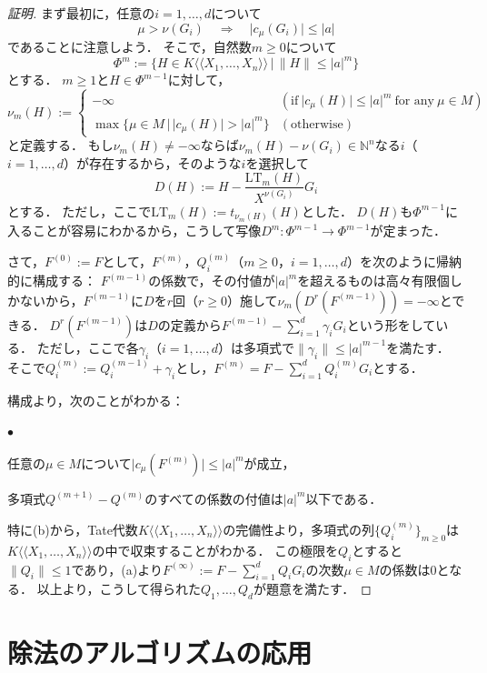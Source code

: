 \documentclass[a4paper,12pt, dvipdfmx]{jsbook}
\def\N{\mathbb{N}}
\def\dl{\langle\!\langle}
\def\dr{\rangle\!\rangle}
\def\LT{\mathrm{LT}}
\newcommand{\abs}[1]{\lvert#1\rvert}
\newcommand{\abss}[1]{\|#1\|}
\renewenvironment{itemize}%
{%
   \begin{list}{\parbox{1zw}{$\bullet$}}%
   {%
      \setlength{\topsep}{.5zh}
      \setlength{\itemindent}{0zw}
      \setlength{\leftmargin}{3zw}%
      \setlength{\rightmargin}{0zw}%
      \setlength{\labelsep}{.5zw}%
      \setlength{\labelwidth}{3zw}%
      \setlength{\itemsep}{0.2em}%
      \setlength{\parsep}{0em}%
      \setlength{\listparindent}{0zw}%
   }
}{%
   \end{list}%
}
\theoremstyle{plain}
\theoremstyle{definition}
\begin{document}
\begin{proof}[証明]
まず最初に，任意の$i=1,\ldots,d$について
$$
\mu>\nu(G_i)\quad\Longrightarrow\quad\abs{c_{\mu}(G_i)}\leq\abs{a}
$$
であることに注意しよう．
そこで，自然数$m\geq 0$について
$$
\Phi^m:=\{H\in K\dl X_1,\ldots,X_n\dr\,|\,\abss{H}\leq\abs{a}^m\}
$$
とする．
$m\geq 1$と$H\in\Phi^{m-1}$に対して，
$$
\nu_m(H):=\begin{cases}-\infty&(\textrm{if}\ \abs{c_{\mu}(H)}\leq\abs{a}^m\ \textrm{for any}\ \mu\in M)\\ \max\{\mu\in M\,|\,\abs{c_{\mu}(H)}>\abs{a}^m\}&(\textrm{otherwise})\end{cases}
$$
と定義する．
もし$\nu_m(H)\neq-\infty$ならば$\nu_m(H)-\nu(G_i)\in\N^n$なる$i$（$i=1,\ldots,d$）が存在するから，そのような$i$を選択して
$$
D(H):=H-\frac{\LT_m(H)}{X^{\nu(G_i)}}G_i
$$
とする．
ただし，ここで$\LT_m(H):=t_{\nu_m(H)}(H)$とした．
$D(H)$も$\Phi^{m-1}$に入ることが容易にわかるから，こうして写像$D^m\colon\Phi^{m-1}\rightarrow\Phi^{m-1}$が定まった．

さて，$F^{(0)}:=F$として，$F^{(m)}$，$Q^{(m)}_i$（$m\geq 0$，$i=1,\ldots,d$）を次のように帰納的に構成する：
$F^{(m-1)}$の係数で，その付値が$\abs{a}^m$を超えるものは高々有限個しかないから，$F^{(m-1)}$に$D$を$r$回（$r\geq 0$）施して$\nu_m(D^r(F^{(m-1)}))=-\infty$とできる．
$D^r(F^{(m-1)})$は$D$の定義から$F^{(m-1)}-\sum^d_{i=1}\gamma_iG_i$という形をしている．
ただし，ここで各$\gamma_i$（$i=1,\ldots,d$）は多項式で$\abss{\gamma_i}\leq\abs{a}^{m-1}$を満たす．
そこで$Q^{(m)}_i:=Q^{(m-1)}_i+\gamma_i$とし，$F^{(m)}=F-\sum^d_{i=1}Q^{(m)}_iG_i$とする．

構成より，次のことがわかる：
\begin{itemize}
\item[{\rm (a)}] 任意の$\mu\in M$について$\abs{c_{\mu}(F^{(m)})}\leq\abs{a}^m$が成立，
\item[{\rm (b)}] 多項式$Q^{(m+1)}-Q^{(m)}$のすべての係数の付値は$\abs{a}^m$以下である．
\end{itemize}
特に(b)から，Tate代数$K\dl X_1,\ldots,X_n\dr$の完備性より，多項式の列$\{Q^{(m)}_i\}_{m\geq 0}$は$K\dl X_1,\ldots,X_n\dr$の中で収束することがわかる．
この極限を$Q_i$とすると$\abss{Q_i}\leq 1$であり，(a)より$F^{(\infty)}:=F-\sum^d_{i=1}Q_iG_i$の次数$\mu\in M$の係数は$0$となる．
以上より，こうして得られた$Q_1,\ldots,Q_d$が題意を満たす．
\end{proof}

\section{除法のアルゴリズムの応用}\label{sec-applicationalgorithm}
\end{document}
